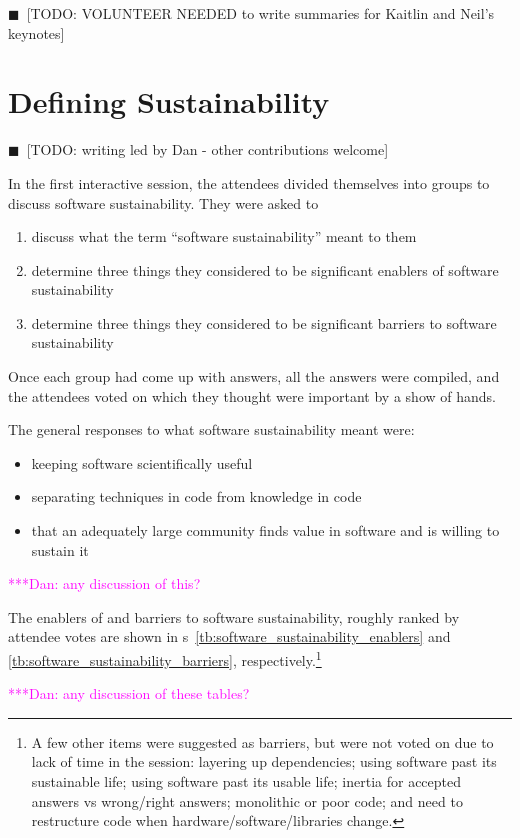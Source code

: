 \documentclass[11pt, oneside]{amsart}
\newcommand{\todo}[1]{{\color{blue}$\blacksquare$~\textsf{[TODO: #1]}}}
\newcommand{\katznote}[1]{ {\textcolor{magenta}    { ***Dan:      #1 }}}
\begin{document}
\todo{VOLUNTEER NEEDED to write summaries for Kaitlin and Neil's keynotes}

\section{Defining Sustainability}

\todo{writing led by Dan - other contributions welcome}

In the first interactive session, the attendees divided themselves into groups to discuss software sustainability.  They were asked to
\begin{enumerate}
\item discuss what the term ``software sustainability'' meant to them
\item determine three things they considered to be significant enablers of software sustainability
\item determine three things they considered to be significant barriers to software sustainability
\end{enumerate}
Once each group had come up with answers, all the answers were compiled, and the attendees voted on which they thought were important by a show of hands.

The general responses to what software sustainability meant were:

\begin{itemize}
\item keeping software scientifically useful
\item separating techniques in code from knowledge in code
\item that an adequately large community finds value in software and is willing to sustain it
\end{itemize}

\katznote{any discussion of this?}

The enablers of and barriers to software sustainability, roughly ranked by attendee votes are shown in {\tablename}s~\ref{tb:software_sustainability_enablers} and \ref{tb:software_sustainability_barriers}, respectively.\footnote{A few other items were suggested as barriers, but were not voted on due to lack of time in the session:
layering up dependencies;
using software past its sustainable life;
using software past its usable life;
inertia for accepted answers vs wrong/right answers;
monolithic or poor code; and
need to restructure code when hardware/software/libraries change.
}

\katznote{any discussion of these tables?}
\end{document}
